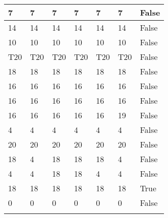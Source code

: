 \begin{longtable}[htbp]{| p{} | p{} | p{}| p{}| p{}| p{}| p{}|}
7 & 7 & 7 & 7 & 7 & 7 & False \\ \hline
14 & 14 & 14 & 14 & 14 & 14 & False \\ \hline
10 & 10 & 10 & 10 & 10 & 10 & False \\ \hline
\multicolumn{1}{|l|}{T20} & \multicolumn{1}{l|}{T20} & \multicolumn{1}{l|}{T20} & \multicolumn{1}{l|}{T20} & \multicolumn{1}{l|}{T20} & \multicolumn{1}{l|}{T20} & False \\ \hline
18 & 18 & 18 & 18 & 18 & 18 & False \\ \hline
16 & 16 & 16 & 16 & 16 & 16 & False \\ \hline
16 & 16 & 16 & 16 & 16 & 16 & False \\ \hline
16 & 16 & 16 & 16 & 16 & 19 & False \\ \hline
4 & 4 & 4 & 4 & 4 & 4 & False \\ \hline
20 & 20 & 20 & 20 & 20 & 20 & False \\ \hline
18 & 4 & 18 & 18 & 18 & 4 & False \\ \hline
4 & 4 & 18 & 18 & 4 & 4 & False \\ \hline
18 & 18 & 18 & 18 & 18 & 18 & True \\ \hline
0 & 0 & 0 & 0 & 0 & 0 & False \\ \hline
\caption{}
\label{}
\end{longtable}
